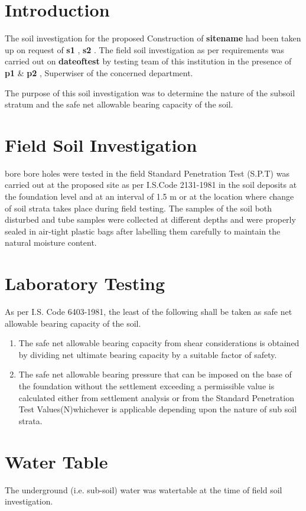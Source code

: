 \documentclass{soil12}
\begin{document}
\section{Introduction}
The soil investigation for the proposed Construction of \textbf{
{{sitename}}
} had been taken up on request of \textbf{
{{s1}}
}, 
\textbf{
{{s2}}
}. The field soil investigation as per requirements was carried out on \textbf{
{{dateoftest}}
} by testing team of this institution in the presence of \textbf{
{{p1}}
} \& \textbf{
{{p2}}
}, Superwiser of the concerned department.\par
The purpose of this soil investigation was to determine the nature of the subsoil stratum and the safe net
allowable bearing capacity of the soil.

\section{Field Soil Investigation}
{{bore}} bore holes were tested in the field Standard Penetration Test (S.P.T) was carried out at the proposed
site as per I.S.Code 2131-1981 in the soil deposits at the foundation level and at an interval of 1.5 m or at
the location where change of soil strata takes place during field testing. The samples of the soil both
disturbed and tube samples were collected at different depths and were properly sealed in air-tight plastic
bags after labelling them carefully to maintain the natural moisture content.
\section{Laboratory Testing}
As per I.S. Code 6403-1981, the least of the following shall be taken as safe net allowable bearing
capacity of the soil.
\begin{enumerate}
\item{The safe net allowable bearing capacity from shear considerations is obtained by dividing net
ultimate bearing capacity by a suitable factor of safety.}
\item{The safe net allowable bearing pressure that can be imposed on the base of the foundation
without the settlement exceeding a permissible value is calculated either from settlement
analysis or from the Standard Penetration Test Values(N)whichever is applicable depending
upon the nature of sub soil strata.}
\end{enumerate}
\section{Water Table}
The underground (i.e. sub-soil) water was {{watertable}}  at the time of field soil investigation.
\end{document}
